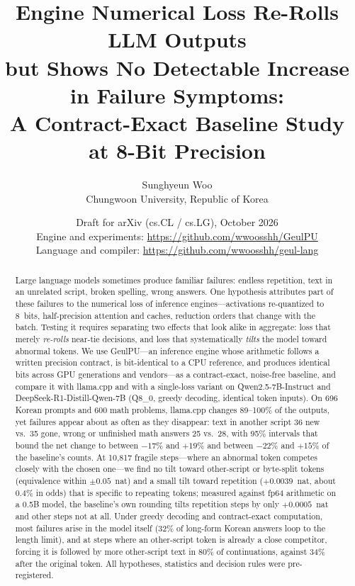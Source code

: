 \documentclass[11pt]{article}
\title{Engine Numerical Loss Re-Rolls LLM Outputs\\
       but Shows No Detectable Increase in Failure Symptoms:\\[2pt]
       {\large A Contract-Exact Baseline Study at 8-Bit Precision}}
\author{Sunghyeun Woo\\[2pt]
        {\normalsize Chungwoon University, Republic of Korea}}
\date{{\normalsize Draft for arXiv (cs.CL / cs.LG), October 2026}\\[6pt]
      {\small Engine and experiments: \url{https://github.com/wwoosshh/GeulPU}\\
       Language and compiler: \url{https://github.com/wwoosshh/geul-lang}}}
\begin{document}
\maketitle

\begin{abstract}
Large language models sometimes produce familiar failures: endless repetition, text in an unrelated script, broken spelling,
wrong answers. One hypothesis attributes part of these failures to the numerical loss of inference engines---activations
re-quantized to 8~bits, half-precision attention and caches, reduction orders that change with the batch. Testing it requires
separating two effects that look alike in aggregate: loss that merely \emph{re-rolls} near-tie decisions, and loss that
systematically \emph{tilts} the model toward abnormal tokens. We use GeulPU---an inference engine whose arithmetic follows a
written precision contract, is bit-identical to a CPU reference, and produces identical bits across GPU generations and
vendors---as a contract-exact, noise-free baseline, and compare it with llama.cpp and with a single-loss variant on
Qwen2.5-7B-Instruct and DeepSeek-R1-Distill-Qwen-7B (Q8\_0, greedy decoding, identical token inputs). On 696 Korean prompts
and 600 math problems, llama.cpp changes 89--100\% of the outputs, yet failures appear about as often as they disappear: text
in another script 36 new vs.\ 35 gone, wrong or unfinished math answers 25 vs.\ 28, with 95\% intervals that bound the net
change to between $-17$\% and $+19$\% and between $-22$\% and $+15$\% of the baseline's counts. At 10,817 fragile steps---where
an abnormal token competes closely with the chosen one---we find no tilt toward other-script or byte-split tokens
(equivalence within $\pm0.05$~nat) and a small tilt toward repetition ($+0.0039$~nat, about 0.4\% in odds) that is specific to
repeating tokens; measured against fp64 arithmetic on a 0.5B model, the baseline's own rounding tilts repetition steps by only
$+0.0005$~nat and other steps not at all. Under greedy decoding and contract-exact computation, most failures arise in the model
itself (32\% of
long-form Korean answers loop to the length limit), and at steps where an other-script token is already a close competitor,
forcing it is followed by more other-script text in 80\% of continuations, against 34\% after the original token. All
hypotheses, statistics and decision rules were pre-registered.
\end{abstract}

\end{document}
